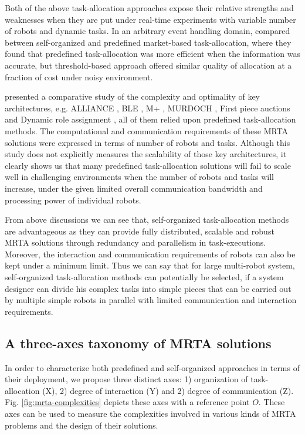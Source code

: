 Both of the above task-allocation approaches expose their relative strengths and weaknesses when they are put under real-time experiments with variable number of robots and dynamic tasks. In an arbitrary event handling domain,   compared between self-organized and predefined market-based task-allocation,  where they found that predefined  task-allocation was more efficient when the information was accurate, but threshold-based  approach offered similar quality of allocation at a fraction of cost  under noisy environment.  

 presented a comparative study of  the complexity and optimality of key architectures, e.g.  ALLIANCE \cite{Parker1998}, BLE \cite{Werger2001}, M+ \cite{Botelho+1999}, MURDOCH \cite{Gerkey+2002}, First piece auctions \cite{Zlot+2002} and Dynamic role assignment \cite{Chaimowicz2002}, all of them relied upon predefined task-allocation methods. The computational and communication requirements of these MRTA solutions were expressed in terms of number of robots and tasks. Although this study does not explicitly measures the scalability of those key architectures, it clearly shows us that many predefined task-allocation solutions will fail to scale well in challenging environments  when the number of  robots and tasks will increase, under the given limited overall communication bandwidth and processing power of individual robots. 

From above discussions we can see that, self-organized task-allocation methods are advantageous as they can provide fully distributed, scalable and robust MRTA solutions through redundancy and parallelism in task-executions. Moreover, the interaction and communication requirements of robots can also be kept under a minimum limit.  Thus  we can say that for large multi-robot system, self-organized task-allocation methods  can potentially be selected, if a system designer can divide his complex tasks into simple pieces that can be carried out by multiple simple robots in parallel with limited communication and interaction requirements.
\subsection{A three-axes taxonomy of MRTA solutions}
\label{bg:mrta:3a-taxonomy}
In order to characterize both predefined and self-organized approaches in terms of their deployment, we propose three distinct axes: 1) organization of task-allocation (X), 2) degree of interaction (Y) and 2) degree of communication (Z). Fig. \ref{fig:mrta-complexities} depicts these axes with a reference point $O$. These axes can be used to measure the complexities involved in various kinds of MRTA problems and the design of their solutions. 

